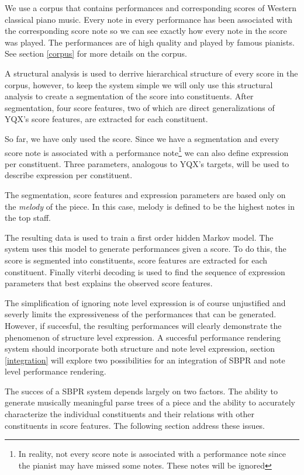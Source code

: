 \documentclass[a4paper,10pt]{article}
\begin{document}
We use a corpus that contains performances and corresponding scores of Western classical piano music. Every note in every performance has been associated with the corresponding score note so we can see exactly how every note in the score was played. The performances are of high quality and played by famous pianists. See section \ref{corpus} for more details on the corpus.

A structural analysis is used to derrive hierarchical structure of every score in the corpus, however, to keep the system simple we will only use this structural analysis to create a segmentation of the score into constituents. After segmentation, four score features, two of which are direct generalizations of YQX's score features, are extracted for each constituent. 

So far, we have only used the score. Since we have a segmentation and every score note is associated with a performance note\footnote{In reality, not every score note is associated with a performance note since the pianist may have missed some notes. These notes will be ignored} we can also define expression per constituent. Three parameters, analogous to YQX's targets, will be used to describe expression per constituent.

The segmentation, score features and expression parameters are based only on the \textit{melody} of the piece. In this case, melody is defined to be the highest notes in the top staff.

The resulting data is used to train a first order hidden Markov model. The system uses this model to generate performances given a score. To do this, the score is segmented into constituents, score features are extracted for each constituent. Finally viterbi decoding is used to find the sequence of expression parameters that best explains the observed score features.

The simplification of ignoring note level expression is of course unjustified and severly limits the expressiveness of the performances that can be generated. However, if succesful, the resulting performances will clearly demonstrate the phenomenon of structure level expression. A succesful performance rendering system should incorporate both structure and note level expression, section \ref{integration} will explore two possibilities for an integration of SBPR and note level performance rendering.

The succes of a SBPR system depends largely on two factors. The ability to generate musically meaningful parse trees of a piece and the ability to accurately characterize the individual constituents and their relations with other constituents in score features. The following section address these issues. 
\end{document}
